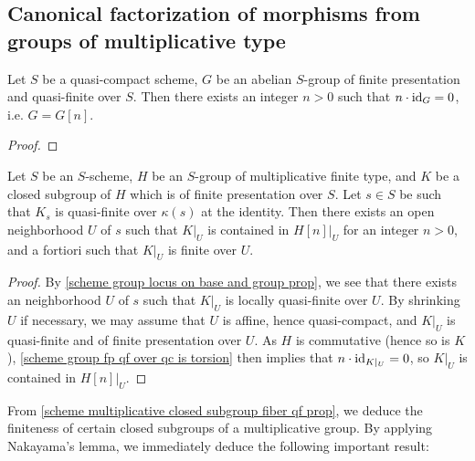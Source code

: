 \subsection{Canonical factorization of morphisms from groups of multiplicative type}

\begin{lemma}\label{scheme group fp qf over qc is torsion}
Let $S$ be a quasi-compact scheme, $G$ be an abelian $S$-group of finite presentation and quasi-finite over $S$. Then there exists an integer $n>0$ such that $n\cdot\operatorname{id}_G=0$, i.e. $G=G[n]$.
\end{lemma}
\begin{proof}

\end{proof}

\begin{corollary}\label{scheme multiplicative closed subgroup fiber qf prop}
Let $S$ be an $S$-scheme, $H$ be an $S$-group of multiplicative finite type, and $K$ be a closed subgroup of $H$ which is of finite presentation over $S$. Let $s\in S$ be such that $K_s$ is quasi-finite over $\kappa(s)$ at the identity. Then there exists an open neighborhood $U$ of $s$ such that $K|_U$ is contained in $H[n]|_U$ for an integer $n>0$, and a fortiori such that $K|_U$ is finite over $U$.
\end{corollary}
\begin{proof}
By \cref{scheme group locus on base and group prop}, we see that there exists an neighborhood $U$ of $s$ such that $K|_U$ is locally quasi-finite over $U$. By shrinking $U$ if necessary, we may assume that $U$ is affine, hence quasi-compact, and $K|_U$ is quasi-finite and of finite presentation over $U$. As $H$ is commutative (hence so is $K$), \cref{scheme group fp qf over qc is torsion} then implies that $n\cdot\operatorname{id}_{K|_U}=0$, so $K|_U$ is contained in $H[n]|_U$.
\end{proof}

From \cref{scheme multiplicative closed subgroup fiber qf prop}, we deduce the finiteness of certain closed subgroups of a multiplicative group. By applying Nakayama's lemma, we immediately deduce the following important result:

